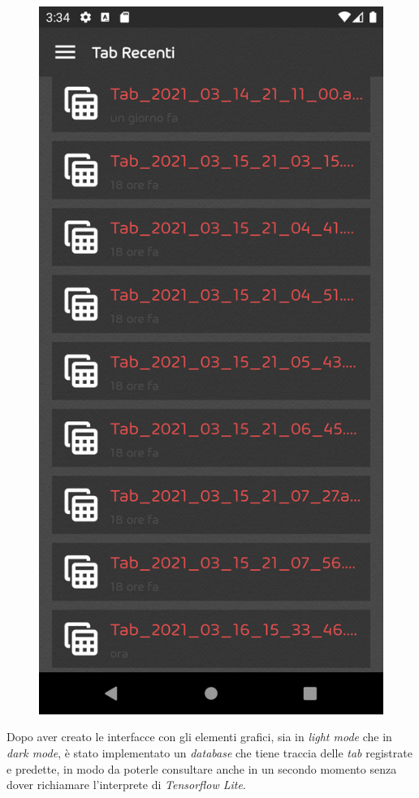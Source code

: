 \begin{figure}[H]
	\includegraphics[scale=0.10]{./images/img20.png}
\end{figure}
Dopo aver creato le interfacce con gli elementi grafici, sia in \textit{light mode} che in \textit{dark mode}, è stato implementato un \textit{database} che tiene traccia delle \textit{tab} registrate e predette, in modo da poterle consultare anche in un secondo momento senza dover richiamare l'interprete di \textit{Tensorflow Lite}.\\
